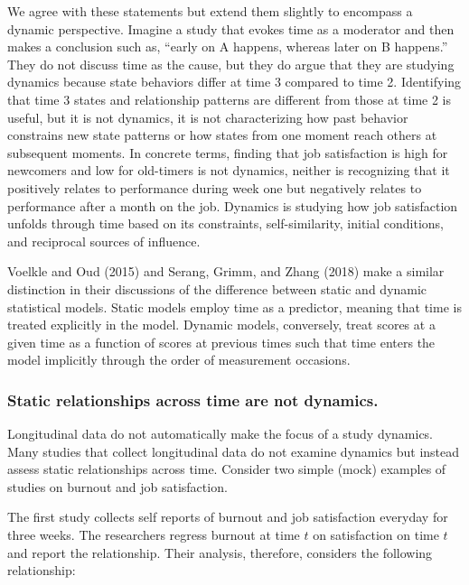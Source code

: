 \documentclass[english,,man]{apa6}
\begin{document}
We agree with these statements but extend them slightly to encompass a dynamic perspective. Imagine a study that evokes time as a moderator and then makes a conclusion such as, \enquote{early on A happens, whereas later on B happens.} They do not discuss time as the cause, but they do argue that they are studying dynamics because state behaviors differ at time 3 compared to time 2. Identifying that time 3 states and relationship patterns are different from those at time 2 is useful, but it is not dynamics, it is not characterizing how past behavior constrains new state patterns or how states from one moment reach others at subsequent moments. In concrete terms, finding that job satisfaction is high for newcomers and low for old-timers is not dynamics, neither is recognizing that it positively relates to performance during week one but negatively relates to performance after a month on the job. Dynamics is studying how job satisfaction unfolds through time based on its constraints, self-similarity, initial conditions, and reciprocal sources of influence.

Voelkle and Oud (2015) and Serang, Grimm, and Zhang (2018) make a similar distinction in their discussions of the difference between static and dynamic statistical models. Static models employ time as a predictor, meaning that time is treated explicitly in the model. Dynamic models, conversely, treat scores at a given time as a function of scores at previous times such that time enters the model implicitly through the order of measurement occasions.

\hypertarget{static-relationships-across-time-are-not-dynamics.}{%
\subsubsection{Static relationships across time are not dynamics.}\label{static-relationships-across-time-are-not-dynamics.}}

Longitudinal data do not automatically make the focus of a study dynamics. Many studies that collect longitudinal data do not examine dynamics but instead assess static relationships across time. Consider two simple (mock) examples of studies on burnout and job satisfaction.

The first study collects self reports of burnout and job satisfaction everyday for three weeks. The researchers regress burnout at time \(t\) on satisfaction on time \(t\) and report the relationship. Their analysis, therefore, considers the following relationship:
\end{document}
